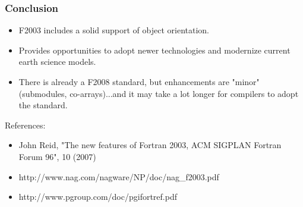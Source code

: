 \documentclass[11pt]{beamer}
\newcommand\FontCcolumn{\fontsize{10}{7.2}\selectfont}
\begin{document}
\begin{frame}[fragile]
\frametitle{Conclusion}

\FontCcolumn

\begin{itemize}
\item F2003 includes a solid support of object orientation.
\item Provides opportunities to adopt newer technologies and modernize current earth science models.
\item There is already a F2008 standard, but enhancements are "minor" (submodules, co-arrays)...and it may take a lot longer for compilers to adopt the standard.
\end{itemize}

\bigskip
References:
\begin{itemize}
\item John Reid, "The new features of Fortran 2003, ACM SIGPLAN Fortran Forum 96", 10 (2007)
\item http://www.nag.com/nagware/NP/doc/nag\_f2003.pdf
\item http://www.pgroup.com/doc/pgifortref.pdf
\end{itemize}
\end{frame}
\end{document}
